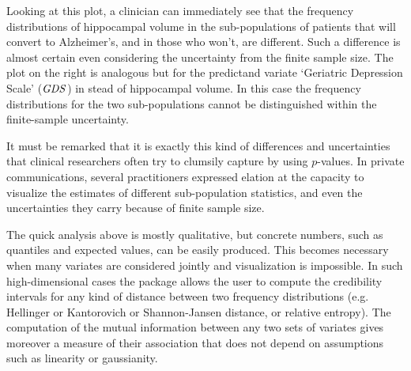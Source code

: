Looking at this plot, a clinician can immediately see that the frequency distributions of hippocampal volume in the sub-populations of patients that will convert to Alzheimer's, and in those who won't, are different. Such a difference is almost certain even considering the uncertainty from the finite sample size. The plot on the right is analogous but for the predictand variate `Geriatric Depression Scale' ($\mathit{GDS}$) in stead of hippocampal volume. In this case the frequency distributions for the two sub-populations cannot be distinguished within the finite-sample uncertainty.

It must be remarked that it is exactly this kind of differences and uncertainties that clinical researchers often try to clumsily capture by using $p$-values. In private communications, several practitioners expressed elation at the capacity to visualize the estimates of different sub-population statistics, and even the uncertainties they carry because of finite sample size.

The quick analysis above is mostly qualitative, but concrete numbers, such as quantiles and expected values, can be easily produced. This becomes necessary when many variates are considered jointly and visualization is impossible. In such high-dimensional cases the package allows the user to compute the credibility intervals for any kind of distance between two frequency distributions (e.g. Hellinger or Kantorovich or Shannon-Jansen distance, or relative entropy). The computation of the mutual information between any two sets of variates gives moreover a measure of their association that does not depend on assumptions such as linearity or gaussianity.

\medskip

